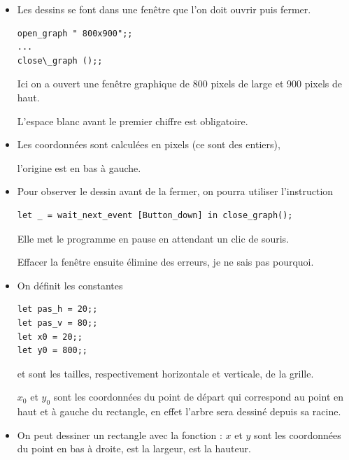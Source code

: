 
\begin{itemize}
    \item Les dessins se font dans une fenêtre que l'on doit ouvrir puis fermer.
\begin{lstlisting}
open_graph " 800x900";;
...
close\_graph ();;
\end{lstlisting}
Ici on a ouvert une fenêtre graphique de 800 pixels de large et 900 pixels de haut. 

L'espace blanc avant le premier chiffre est obligatoire.
\item Les coordonnées sont calculées en pixels (ce sont des entiers), 

l'origine est en bas à gauche.
\item Pour observer le dessin avant de la fermer, on pourra utiliser l'instruction
\begin{lstlisting}
let _ = wait_next_event [Button_down] in close_graph();
\end{lstlisting}
Elle met le programme en pause en attendant un clic de souris.

Effacer la fenêtre ensuite élimine des erreurs, je ne sais pas pourquoi.
\item On définit les constantes 
\begin{lstlisting}
let pas_h = 20;;
let pas_v = 80;;
let x0 = 20;;
let y0 = 800;;
\end{lstlisting}
 et  sont les tailles, respectivement horizontale et verticale, de la grille.

$x_0$ et $y_0$ sont les coordonnées du point de départ qui correspond au point en haut et à gauche du rectangle, en effet l'arbre sera dessiné depuis sa racine.
\item On peut dessiner un rectangle avec la fonction  : $x$ et $y$ sont les coordonnées du point en bas à droite,  est la largeur,  est la hauteur.
\end{itemize}
